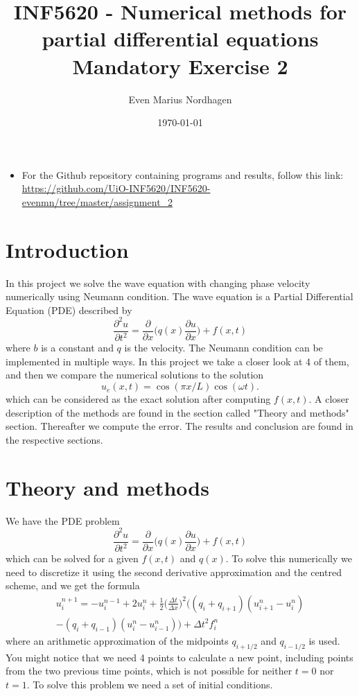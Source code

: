 \documentclass[norsk,a4paper,12pt]{article}
\title{INF5620 - Numerical methods for partial differential equations\\\vspace{2mm} \Large{Mandatory Exercise 2}}
\author{\large Even Marius Nordhagen}
\date\today
\begin{document}
\maketitle

\begin{itemize}
\item For the Github repository containing programs and results, follow this link: 
\url{https://github.com/UiO-INF5620/INF5620-evenmn/tree/master/assignment_2}
\end{itemize}

\section{Introduction}
In this project we solve the wave equation with changing phase velocity numerically using Neumann condition. The wave equation is a Partial Differential Equation (PDE) described by
\begin{equation}
\frac{\partial^2 u}{\partial t^2}=\frac{\partial}{\partial x}\bigg(q(x)\frac{\partial u}{\partial x}\bigg) +f(x,t)
\label{pde}
\end{equation}
where $b$ is a constant and $q$ is the velocity. The Neumann condition can be implemented in multiple ways. In this project we take a closer look at 4 of them, and then we compare the numerical solutions to the solution
\begin{equation}
u_e(x,t)=\cos(\pi x/L)\cos(\omega t).
\end{equation}
which can be considered as the exact solution after computing $f(x,t)$. A closer description of the methods are found in the section called "Theory and methods" section. Thereafter we compute the error. The results and conclusion are found in the respective sections. 

\section{Theory and methods}
We have the PDE problem
\begin{equation*}
\frac{\partial^2 u}{\partial t^2}=\frac{\partial}{\partial x}\bigg(q(x)\frac{\partial u}{\partial x}\bigg) +f(x,t)
\label{pde}
\end{equation*}
which can be solved for a given $f(x,t)$ and $q(x)$. To solve this numerically we need to discretize it using the second derivative approximation and the centred scheme, and we get the formula
\begin{equation}
\begin{split}
u_i^{n+1}=-u_i^{n-1}+2u_i^n+\frac{1}{2}\bigg(\frac{\Delta t}{\Delta x}\bigg)^2\Big((q_i+q_{i+1})(u_{i+1}^n-u_i^n)\\
-(q_i+q_{i-1})(u_i^n-u_{i-1}^n)\Big)+\Delta t^2f_i^n
\end{split}
\end{equation}
where an arithmetic approximation of the midpoints $q_{i+1/2}$ and $q_{i-1/2}$ is used. You might notice that we need 4 points to calculate a new point, including points from the two previous time points, which is not possible for neither $t=0$ nor $t=1$. To solve this problem we need a set of initial conditions.
\end{document}
